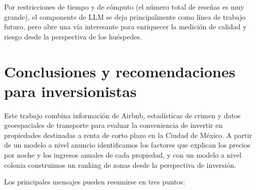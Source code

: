 \documentclass[12pt]{article}
\begin{document}
Por restricciones de tiempo y de cómputo (el número total de reseñas es muy grande), el componente de LLM se deja principalmente como línea de trabajo futuro, pero abre una vía interesante para enriquecer la medición de calidad y riesgo desde la perspectiva de los huéspedes.

\section{Conclusiones y recomendaciones para inversionistas}

Este trabajo combina información de Airbnb, estadísticas de crimen y datos geoespaciales de transporte para evaluar la conveniencia de invertir en propiedades destinadas a renta de corto plazo en la Ciudad de México. A partir de un modelo a nivel anuncio identificamos los factores que explican los precios por noche y los ingresos anuales de cada propiedad, y con un modelo a nivel colonia construimos un ranking de zonas desde la perspectiva de inversión.

Los principales mensajes pueden resumirse en tres puntos:
\end{document}
